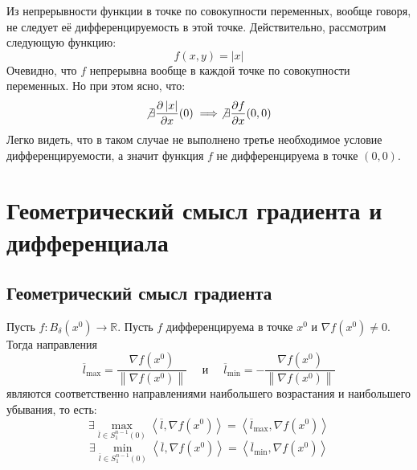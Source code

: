 \documentclass[11pt]{article}
\begin{document}
\begin{remark}
    Из непрерывности функции в точке по совокупности переменных, вообще говоря, не следует 
    её дифференцируемость в этой точке. Действительно, рассмотрим следующую функцию:
    \[f(x, y) = \left\lvert x \right\rvert \]
    Очевидно, что $f$ непрерывна вообще в каждой точке по совокупности переменных. Но при этом ясно, что:
    \[\not \exists \frac{\partial \left\lvert x \right\rvert}{\partial x} (0) \implies \not \exists \frac{\partial f}{\partial x} (0, 0)\]
    Легко видеть, что в таком случае не выполнено третье необходимое условие дифференцируемости, а значит функция $f$ не дифференцируема в точке $(0, 0)$.
\end{remark}

\section{Геометрический смысл градиента и дифференциала}

\subsection{Геометрический смысл градиента}

\begin{theorem}
    Пусть $f \colon B_{\delta} \left(x^0\right) \to \mathbb{R}$. Пусть $f$ дифференцируема в точке $x^0$ и $\nabla f \left(x^0\right) \neq 0$.
    Тогда направления 
    \[ \overline{l}_{\max} = \frac{\nabla f \left(x^0\right)}{\left\lVert \nabla f \left(x^0\right) \right\rVert} \quad \text{ и } \quad \overline{l}_{\min} = - \frac{\nabla f \left(x^0\right)}{\left\lVert \nabla f \left(x^0\right) \right\rVert} \]
    являются соответственно направлениями наибольшего возрастания и наибольшего убывания, то есть:
    \[\exists \max_{\overline{l} \in S_1^{n - 1}(0)} \left\langle \overline{l}, \nabla f \left(x^0\right)\right\rangle = \left\langle \overline{l}_{\max}, \nabla f \left(x^0\right)\right\rangle  \]
    \[\exists \min_{\overline{l} \in S_1^{n - 1}(0)} \left\langle \overline{l}, \nabla f \left(x^0\right)\right\rangle = \left\langle \overline{l}_{\min}, \nabla f \left(x^0\right)\right\rangle  \]
\end{theorem}
\end{document}
